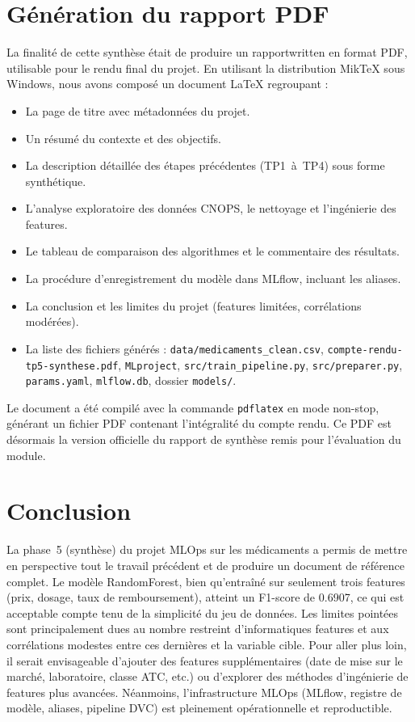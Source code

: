 \documentclass[12pt,a4paper]{report}
\begin{document}
\section{Génération du rapport PDF}
La finalité de cette synthèse était de produire un rapportwritten en format PDF, utilisable pour le rendu final du projet. En utilisant la distribution MikTeX sous Windows, nous avons composé un document LaTeX regroupant :
\begin{itemize}
    \item La page de titre avec métadonnées du projet.
    \item Un résumé du contexte et des objectifs.
    \item La description détaillée des étapes précédentes (TP1~à~TP4) sous forme synthétique.
    \item L'analyse exploratoire des données CNOPS, le nettoyage et l'ingénierie des features.
    \item Le tableau de comparaison des algorithmes et le commentaire des résultats.
    \item La procédure d'enregistrement du modèle dans MLflow, incluant les aliases.
    \item La conclusion et les limites du projet (features limitées, corrélations modérées).
    \item La liste des fichiers générés : \texttt{data/medicaments\_clean.csv}, \texttt{compte-rendu-tp5-synthese.pdf}, \texttt{MLproject}, \texttt{src/train\_pipeline.py}, \texttt{src/preparer.py}, \texttt{params.yaml}, \texttt{mlflow.db}, dossier \texttt{models/}.
\end{itemize}
Le document a été compilé avec la commande \texttt{pdflatex} en mode non-stop, générant un fichier PDF contenant l'intégralité du compte rendu. Ce PDF est désormais la version officielle du rapport de synthèse remis pour l'évaluation du module.

\section{Conclusion}
La phase~5 (synthèse) du projet MLOps sur les médicaments a permis de mettre en perspective tout le travail précédent et de produire un document de référence complet. Le modèle RandomForest, bien qu'entraîné sur seulement trois features (prix, dosage, taux de remboursement), atteint un F1-score de 0.6907, ce qui est acceptable compte tenu de la simplicité du jeu de données. Les limites pointées sont principalement dues au nombre restreint d'informatiques features et aux corrélations modestes entre ces dernières et la variable cible. Pour aller plus loin, il serait envisageable d'ajouter des features supplémentaires (date de mise sur le marché, laboratoire, classe ATC, etc.) ou d'explorer des méthodes d'ingénierie de features plus avancées. Néanmoins, l'infrastructure MLOps (MLflow, registre de modèle, aliases, pipeline DVC) est pleinement opérationnelle et reproductible.
\end{document}
